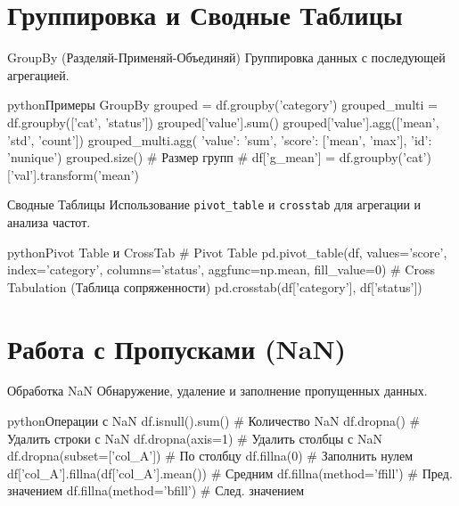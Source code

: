     \section{Группировка и Сводные Таблицы}
    
    \begin{myblock}{GroupBy (Разделяй-Применяй-Объединяй)}
    Группировка данных с последующей агрегацией.
    \begin{codebox}{python}{Примеры GroupBy}
    grouped = df.groupby('category')
    grouped_multi = df.groupby(['cat', 'status'])
    grouped['value'].sum()
    grouped['value'].agg(['mean', 'std', 'count'])
    grouped_multi.agg({
        'value': 'sum',
        'score': ['mean', 'max'],
        'id': 'nunique'})
    grouped.size() # Размер групп
    # df['g_mean'] = df.groupby('cat')['val'].transform('mean')
    \end{codebox}
    \end{myblock}
    
    \begin{alerttextbox}{Сводные Таблицы}
    Использование \texttt{pivot\_table} и \texttt{crosstab} для агрегации и анализа частот.
    \begin{codebox}{python}{Pivot Table и CrossTab}
    # Pivot Table
    pd.pivot_table(df, values='score', index='category',
                   columns='status', aggfunc=np.mean,
                   fill_value=0)
    # Cross Tabulation (Таблица сопряженности)
    pd.crosstab(df['category'], df['status'])
    \end{codebox}
    \end{alerttextbox}
    
    \section{Работа с Пропусками (NaN)}
    
    \begin{myblock}{Обработка NaN}
    Обнаружение, удаление и заполнение пропущенных данных.
    \begin{codebox}{python}{Операции с NaN}
    df.isnull().sum() # Количество NaN
    df.dropna() # Удалить строки с NaN
    df.dropna(axis=1) # Удалить столбцы с NaN
    df.dropna(subset=['col_A']) # По столбцу
    df.fillna(0) # Заполнить нулем
    df['col_A'].fillna(df['col_A'].mean()) # Средним
    df.fillna(method='ffill') # Пред. значением
    df.fillna(method='bfill') # След. значением
    \end{codebox}
    \end{myblock}
    
